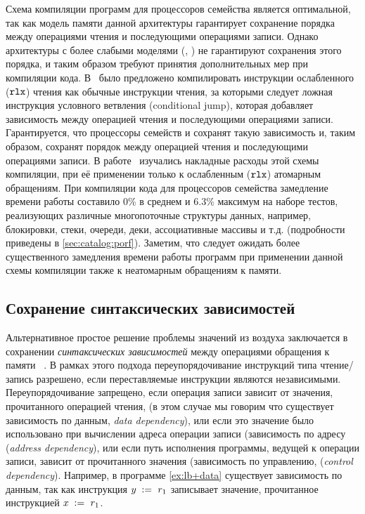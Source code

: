 Схема компиляции программ для процессоров семейства \Intel является оптимальной, 
так как модель памяти данной 
архитектуры гарантирует сохранение порядка 
между операциями чтения и последующими операциями записи. 
Однако архитектуры с более слабыми моделями (\ARM, \POWER)
не гарантируют сохранения этого порядка, 
и таким образом требуют принятия дополнительных мер при компиляции кода. 
В~\cite{Boehm-Demsky:MSPC14} было предложено компилировать 
инструкции ослабленного ($\mathtt{rlx}$) чтения как обычные инструкции чтения, 
за которыми следует ложная инструкция условного ветвления 
(conditional jump), которая добавляет зависимость 
между операцией чтения и последующими операциями записи. 
Гарантируется, что процессоры семейств \ARM и \POWER 
сохранят такую зависимость и, таким образом, 
сохранят порядок между операцией чтения и последующими операциями записи. 
В работе~\cite{Ou-Demsky:OOPSLA18} изучались 
накладные расходы этой схемы компиляции, 
при её применении только к ослабленным ($\mathtt{rlx}$) атомарным обращениям.
При компиляции кода для процессоров семейства  
замедление времени работы составило 0\% в среднем и 6.3\% максимум 
на наборе тестов, реализующих различные многопоточные 
структуры данных, например, блокировки, стеки, очереди, 
деки, ассоциативные массивы и т.д.
(подробности приведены в \ref{sec:catalog:porf}).
Заметим, что следует ожидать более существенного замедления
времени работы программ при применении данной схемы компиляции
также к неатомарным обращениям к памяти. 

\subsection{Сохранение синтаксических зависимостей}
\label{sec:analysis:deprf}

Альтернативное простое решение проблемы значений из воздуха 
заключается в сохранении \emph{синтаксических зависимостей}
между операциями обращения к памяти~%
\cite{Boehm-Demsky:MSPC14, Alglave-al:ASPLOS18}.
В рамках этого подхода переупорядочивание инструкций типа чтение/запись 
разрешено, если переставляемые инструкции являются независимыми. 
Переупорядочивание запрещено, если операция записи зависит 
от значения, прочитанного операцией чтения, 
(в этом случае мы говорим что существует зависимость по данным, \emph{data dependency}),
или если это значение было использовано при вычислении адреса операции записи 
(зависимость по адресу (\emph{address dependency}), 
или если путь исполнения программы, ведущей к операции записи, 
зависит от прочитанного значения 
(зависимость по управлению, (\emph{control dependency}).
Например, в программе \ref{ex:lb+data} 
существует зависимость по данным, так как 
инструкция $y\;:=_{}\;r_1$ записывает 
значение, прочитанное инструкцией $x\;:=_{}\;r_1$. 

